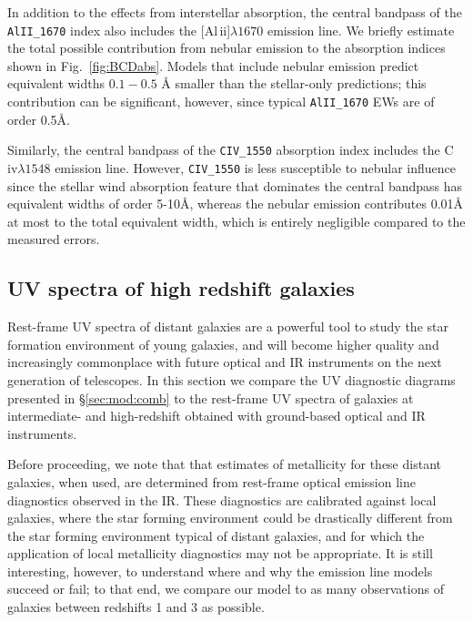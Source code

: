 \documentclass[preprint2]{aastex61}
\newcommand{\civ}{C\,{\sc iv}\xspace}
\newcommand{\alII}{[Al\,{\sc ii}]\xspace}
\newcommand{\ang}{\ensuremath{\mbox{\AA}}\xspace}
\begin{document}
In addition to the effects from interstellar absorption, the central bandpass of the \texttt{AlII\_1670} index also includes the \alII$\lambda1670$ emission line. We briefly estimate the total possible contribution from nebular emission to the absorption indices shown in Fig.~\ref{fig:BCDabs}. Models that include nebular emission predict equivalent widths $0.1 - 0.5$ \ang smaller than the stellar-only predictions; this contribution can be significant, however, since typical \texttt{AlII\_1670} EWs are of order 0.5\ang. 

Similarly, the central bandpass of the \texttt{CIV\_1550} absorption index includes the \civ$\lambda1548$ emission line. However, \texttt{CIV\_1550} is less susceptible to nebular influence since the stellar wind absorption feature that dominates the central bandpass has equivalent widths of order 5-10\ang, whereas the nebular emission contributes 0.01\ang at most to the total equivalent width, which is entirely negligible compared to the measured errors.

\subsection{UV spectra of high redshift galaxies} \label{sec:obs:UV:LBGs}

Rest-frame UV spectra of distant galaxies are a powerful tool to study the star formation environment of young galaxies, and will become higher quality and increasingly commonplace with future optical and IR instruments on the next generation of telescopes. In this section we compare the UV diagnostic diagrams presented in \S\ref{sec:mod:comb} to the rest-frame UV spectra of galaxies at intermediate- and high-redshift obtained with ground-based optical and IR instruments.

Before proceeding, we note that that estimates of metallicity for these distant galaxies, when used, are determined from rest-frame optical emission line diagnostics observed in the IR. These diagnostics are calibrated against local galaxies, where the star forming environment could be drastically different from the star forming environment typical of distant galaxies, and for which the application of local metallicity diagnostics may not be appropriate. It is still interesting, however, to understand where and why the emission line models succeed or fail; to that end, we compare our model to as many observations of galaxies between redshifts 1 and 3 as possible.
\end{document}
